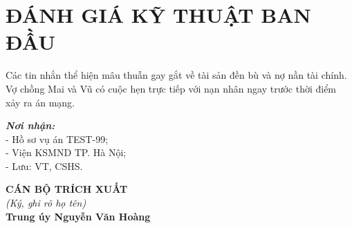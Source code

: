 \documentclass[12pt,a4paper]{article}
\begin{document}
\vspace{0.4cm}

\section*{ĐÁNH GIÁ KỸ THUẬT BAN ĐẦU}
Các tin nhắn thể hiện mâu thuẫn gay gắt về tài sản đền bù và nợ nần tài chính. Vợ chồng Mai và Vũ có cuộc hẹn trực tiếp với nạn nhân ngay trước thời điểm xảy ra án mạng.

\vspace{0.8cm}

\noindent
\begin{minipage}[t]{0.45\textwidth}
    \small
    \textbf{\textit{Nơi nhận:}}\\
    - Hồ sơ vụ án TEST-99;\\
    - Viện KSMND TP. Hà Nội;\\
    - Lưu: VT, CSHS.
\end{minipage}
\hfill
\begin{minipage}[t]{0.5\textwidth}
    \begin{center}
        \small
        \textbf{CÁN BỘ TRÍCH XUẤT}\\
        \textit{(Ký, ghi rõ họ tên)}\\[1.5cm]
        \textbf{Trung úy Nguyễn Văn Hoàng}
    \end{center}
\end{minipage}
\end{document}

